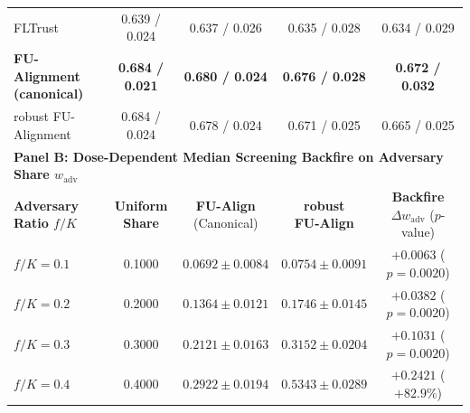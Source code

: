 \begin{table}[!t]
{\begin{tabular}{lcccc}
FLTrust & 0.639 / 0.024 & 0.637 / 0.026 & 0.635 / 0.028 & 0.634 / 0.029 \\
\textbf{FU-Alignment (canonical)} & \textbf{0.684 / 0.021} & \textbf{0.680 / 0.024} & \textbf{0.676 / 0.028} & \textbf{0.672 / 0.032} \\
robust FU-Alignment & 0.684 / 0.024 & 0.678 / 0.024 & 0.671 / 0.025 & 0.665 / 0.025 \\
\midrule
\multicolumn{5}{l}{\textbf{Panel B: Dose-Dependent Median Screening Backfire on Adversary Share $w_{\mathrm{adv}}$}} \\
\midrule
\makecell[l]{\textbf{Adversary} \\ \textbf{Ratio $f/K$}} & \makecell{\textbf{Uniform} \\ \textbf{Share}} & \makecell{\textbf{FU-Align} \\ \scriptsize (Canonical)} & \makecell{\textbf{robust} \\ \textbf{FU-Align}} & \makecell{\textbf{Backfire $\Delta w_{\mathrm{adv}}$} \\ \scriptsize ($p$-value)} \\
\midrule
$f/K = 0.1$ & 0.1000 & $0.0692 \pm 0.0084$ & $0.0754 \pm 0.0091$ & $+0.0063$ ($p = 0.0020$) \\
$f/K = 0.2$ & 0.2000 & $0.1364 \pm 0.0121$ & $0.1746 \pm 0.0145$ & $+0.0382$ ($p = 0.0020$) \\
$f/K = 0.3$ & 0.3000 & $0.2121 \pm 0.0163$ & $0.3152 \pm 0.0204$ & $+0.1031$ ($p = 0.0020$) \\
$f/K = 0.4$ & 0.4000 & $\mathbf{0.2922 \pm 0.0194}$ & $\mathbf{0.5343 \pm 0.0289}$ & $\mathbf{+0.2421}$ ($+82.9\%$) \\
\bottomrule
\end{tabular}%
}
\end{table}
